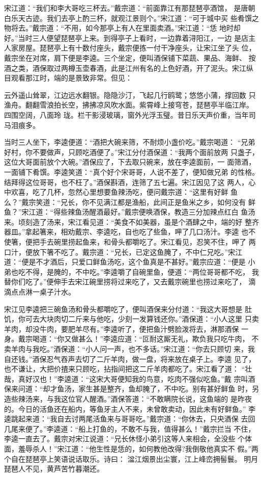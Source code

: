 宋江道：“我们和李大哥吃三杯去。”戴宗道：“前面靠江有那琵琶亭酒馆，
是唐朝白乐天古迹。我们去亭上酌三杯，就观江景则个。”宋江道：“可于城中买
些肴馔之物将去。”戴宗道：“不用，如今那亭上有人在里面卖酒。”宋江道：“恁
地时却好。”当时三人便望琵琶亭上来。到得亭子上看时，一边靠着浔阳江，一边
是店主人家房屋。琵琶亭上有十数付座头，戴宗便拣一付干净座头，让宋江坐了头
位，戴宗坐在对席，肩下便是李逵。三个坐定，便叫酒保铺下菜蔬、果品、海鲜、
按酒之类，酒保取过两樽玉壶春酒，此是江州有名的上色好酒，开了泥头。宋江纵
目观看那江时，端的是景致非常。但见：

云外遥山耸翠，江边远水翻银。隐隐沙汀，飞起几行鸥鹭；悠悠小蒲，撑回数
只渔舟。翻翻雪浪拍长空，拂拂凉风吹水面。紫霄峰上接穹苍，琵琶亭半临江岸。
四围空阔，八面玲
珑。栏干影浸玻璃，窗外光浮玉璧。昔日乐天声价重，当年司马泪痕多。

当时三人坐下，李逵便道：“酒把大碗来筛，不耐烦小盏价吃。”戴宗喝道：
“兄弟好村，你不要做声，只顾吃酒便了。”宋江分付酒保道：“我两个面前放两
只盏子，这位大哥面前放个大碗。”酒保应了，下去取只碗来，放在李逵面前，一
面筛酒，一面铺下肴馔。李逵笑道：“真个好个宋哥哥，人说不差了，便知做兄弟
的性格。结拜得这位哥哥，也不枉了。”酒保斟酒，连筛了五七遍。宋江因见了这
两人，心中欢喜，吃了几杯，忽然心里想要鱼辣汤吃，便问戴宗道：“这里有好鲜
鱼么？”戴宗笑道：“兄长，你不见满江都是渔船，此间正是鱼米之乡，如何没有
鲜鱼？”宋江道：“得些辣鱼汤醒酒最好。”戴宗便唤酒保，教造三分加辣点红白
鱼汤来。顷刻造了汤来，宋江看见道：“美食不如美器，虽是个酒肆之中，端的好
整齐器皿。”拿起箸来，相劝戴宗、李逵吃，自也吃了些鱼，呷了几口汤汁。李逵
也不使箸，便把手去碗里捞起鱼来，和骨头都嚼吃了。宋江看见，忍笑不住，呷了
两口汁，便放下箸不吃了。戴宗道：“兄长，已定这鱼腌了，不中仁兄吃。”宋江
道：“便是不才酒后，只爱口鲜鱼汤吃，这个鱼真是不甚好。”戴宗应道：“便是
小弟也吃不得，是腌的，不中吃。”李逵嚼了自碗里鱼，便道：“两位哥哥都不吃，
我替你们吃了。”便伸手去宋江碗里捞将过来吃了，又去戴宗碗里也捞过来吃了，
滴滴点点淋一桌子汁水。

宋江见李逵把三碗鱼汤和骨头都嚼吃了，便叫酒保来分付道：“我这大哥想是
肚饥，你可去大块肉切二斤来与他吃，少刻一发算钱还你。”酒保道：“小人这里
只卖羊肉，却没牛肉，要肥羊尽有。”李逵听了，便把鱼汁劈脸泼将去，淋那酒保
一身。戴宗喝道：“你又做甚么！”李逵应道：“叵耐这厮无礼，欺负我只吃牛肉，
不卖羊肉与我吃。”酒保道：“小人问一声，也不多话。”宋江道：“你去只顾切
来，我自还钱。”酒保忍气吞声去切了二斤羊肉，做一盘，将来放在桌子上。李逵
见了，也不谦让，大把价揸来只顾吃，拈指间把这二斤羊肉都吃了。宋江看了道：
“壮哉，真好汉也！”李逵道：“这宋大哥便知我的鸟意，吃肉不强似吃鱼。”戴
宗叫酒保来问道：“却才鱼汤，家生甚是整齐，鱼却腌了，不中吃。别有甚好鲜鱼
时，另造些辣汤来，与我这位官人醒酒。”酒保答道：“不敢瞒院长说，这鱼端的
是昨夜的。今日的活鱼还在船内，等鱼牙主人不来，未曾敢卖动，因此未有好鲜鱼。”
李逵跳起来道：“我自去讨两尾活鱼来与哥哥吃。”戴宗道：“你休去，只央酒保
去回几尾来便了。”李逵道：“船上打鱼的，不敢不与我，值得甚么！”戴宗拦当
不住，李逵一直去了。戴宗对宋江说道：“兄长休怪小弟引这等人来相会，全没些
个体面，羞辱杀人！”宋江道：“他生性是恁的，如何教他改得?我倒敬他真实不
假。”两个自在琵琶亭上笑语说话取乐。诗曰：
湓江烟景出尘寰，江上峰峦拥髻鬟。
明月琵琶人不见，黄芦苦竹暮潮还。

